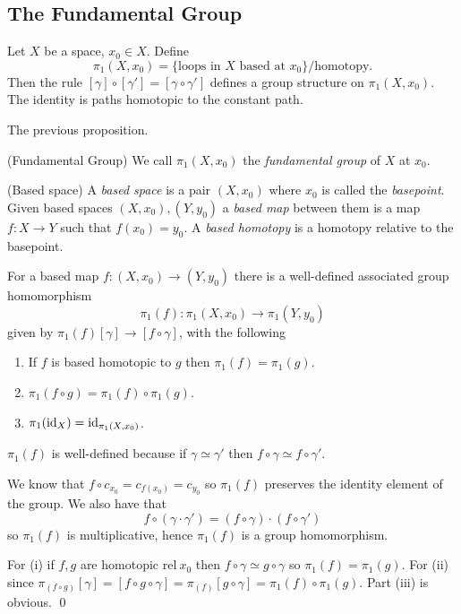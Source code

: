 \documentclass{article}
\newcommand{\rel}{\mathrm{rel}\:}
\begin{document}
\subsection{The Fundamental Group}
\begin{proposition}
  Let $ X $ be a space, $ x_0 \in X $. Define
  \[
	  \pi_1(X,x_0) = \{ \text{loops in } X \text{ based at } x_0\}/ \text{homotopy}.
  \]
  Then the rule $ [\gamma]\circ [\gamma'] = [ \gamma \circ \gamma'] $ defines a group structure on $ \pi_1(X,x_0) $. The identity is paths homotopic to the constant path.
\end{proposition}
\pf The previous proposition.
\begin{definition}
	(Fundamental Group) We call $ \pi_1(X,x_0) $ the \textit{fundamental group} of $ X $ at $ x_0 $.
\end{definition}
\begin{definition}
	(Based space) A \textit{based space} is a pair $ (X,x_0) $ where $ x_0 $ is called the \textit{basepoint}. Given based spaces $ (X,x_0), (Y,y_0) $ a \textit{based map} between them is a map $ f:X\to Y $ such that $ f(x_0) = y_0 $. A \textit{based homotopy} is a homotopy relative to the basepoint.
\end{definition}
\begin{proposition}
  For a based map $ f: (X,x_0) \to (Y,y_0) $ there is a well-defined associated group homomorphism
  \[
    \pi_1(f): \pi_1(X,x_0) \to \pi_1(Y,y_0)
  \]
  given by $ \pi_1(f)[\gamma] \to [f \circ \gamma] $, with the following
  \begin{enumerate}
	  \item If $ f $ is based homotopic to $ g $ then $ \pi_1(f) = \pi_1(g) $.
	  \item $ \pi_1(f\circ g) = \pi_1(f) \circ \pi_1(g) $.
	  \item $ \pi_1(\mathrm{id}_X) = \mathrm{id}_{\pi_1(X,x_0)} $.
  \end{enumerate}
\end{proposition}
\pf $ \pi_1(f) $ is well-defined because if $ \gamma \simeq \gamma' $ then $ f\circ \gamma \simeq f \circ\gamma' $.\par
We know that $ f \circ c_{x_0} = c_{f(x_0)} = c_{y_0} $ so $ \pi_1(f) $ preserves the identity element of the group. We also have that 
\[
  f\circ (\gamma \cdot \gamma') = (f \circ \gamma) \cdot (f \circ \gamma')
\]
so $ \pi_1(f) $ is multiplicative, hence $ \pi_1(f) $ is a group homomorphism.
\par
For (i) if $ f,g $ are homotopic $ \rel x_0 $ then $ f\circ \gamma \simeq g \circ \gamma $ so $ \pi_1(f) = \pi_1(g) $. For (ii) since $ \pi_(f\circ g)[\gamma] = [f \circ g\circ \gamma] = \pi_(f)[g\circ \gamma] = \pi_1(f) \circ \pi_1(g) $. Part (iii) is obvious. \qed
\end{document}
